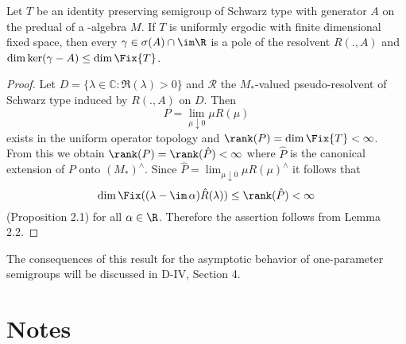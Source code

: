 \begin{theorem}\label{thm:d3-2.5}
Let $T$ be an identity preserving semigroup of Schwarz type with generator $A$ on the predual of a \WA-algebra $M$.
If $T$ is uniformly ergodic with finite dimensional fixed space, then every $\gamma \in \sigma(A) \cap \im\R$ is a pole of the resolvent $R(.,A)$ and $\dim \ker(\gamma - A) \leq \dim \Fix{T}$.
\end{theorem}

\begin{proof}
Let $D = \{\lambda \in \mathbb{C} \colon \Re(\lambda) > 0\}$ and $\mathcal{R}$ the $M_{*}$-valued pseudo-resolvent of Schwarz type induced by $R(.,A)$ on $D$.
Then
\[
P = \lim_{\mu \downarrow 0}\mu R(\mu)
\]
exists in the uniform operator topology and $\rank(P) = \dim \Fix{T} < \infty$.
From this we obtain $\rank(P) = \rank(\hat{P}) < \infty$ where $\hat{P}$ is the canonical extension of $P$ onto $(M_{*})^{\wedge}$.
Since $\hat{P} = \lim_{\mu \downarrow 0} \mu R(\mu)^{\wedge}$ it follows that
\[
\dim \Fix((\lambda - \im\,\alpha)\hat{R}(\lambda)) \leq \rank(\hat{P}) < \infty
\]
(Proposition 2.1) for all $\alpha \in \R$.
Therefore the assertion follows from Lemma 2.2.
\end{proof}

The consequences of this result for the asymptotic behavior of one-parameter semigroups will be discussed in D-IV, Section 4.

\section*{Notes}\label{notes:d3-notes}

